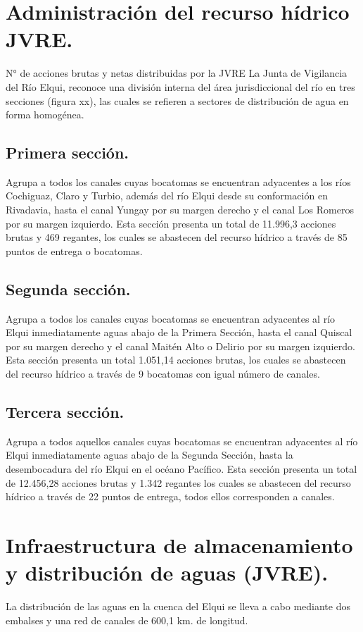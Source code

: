 \documentclass[11pt,]{article}
\begin{document}
\section{Administración del recurso hídrico JVRE.}%

N° de acciones brutas y netas distribuidas por la JVRE
La Junta de Vigilancia del Río Elqui, reconoce una división interna del área jurisdiccional del río en tres secciones (figura xx), las cuales se refieren a sectores de distribución de agua en forma homogénea. 

\subsection{Primera sección.}
Agrupa a todos los canales cuyas bocatomas se encuentran adyacentes a los ríos Cochiguaz, Claro y Turbio, además del río Elqui desde su conformación en Rivadavia, hasta el canal Yungay por su margen derecho y el canal Los Romeros por su margen izquierdo. Esta sección presenta un total de 11.996,3 acciones brutas y 469 regantes, los cuales se abastecen del recurso hídrico a través de 85 puntos de entrega o bocatomas.

\subsection{Segunda sección.}
Agrupa a todos los canales cuyas bocatomas se encuentran adyacentes al río Elqui inmediatamente aguas abajo de la Primera Sección, hasta el canal Quiscal por su margen derecho y el canal Maitén Alto o Delirio por su margen izquierdo. Esta sección presenta un total 1.051,14 acciones brutas, los cuales se abastecen del recurso hídrico a través de 9 bocatomas con igual número de canales.

\subsection{Tercera sección.}
Agrupa a todos aquellos canales cuyas bocatomas se encuentran adyacentes al río Elqui inmediatamente aguas abajo de la Segunda Sección, hasta la desembocadura del río Elqui en el océano Pacífico. Esta sección presenta un total de 12.456,28 acciones brutas y 1.342 regantes los cuales se abastecen del recurso hídrico a través de 22 puntos de entrega, todos ellos corresponden a canales.

\section{Infraestructura de almacenamiento y distribución de aguas (JVRE).}
La distribución de las aguas en la cuenca del Elqui se lleva a cabo mediante dos embalses y una red de canales de 600,1 km. de longitud.
\end{document}
